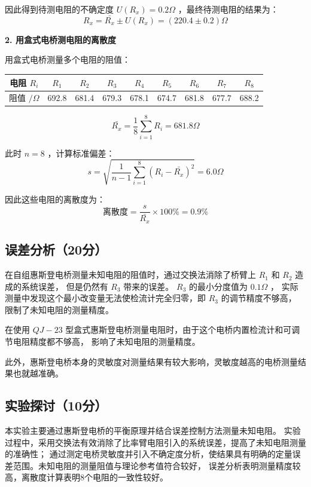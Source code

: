 \documentclass{Phyport}
\begin{document}
因此得到待测电阻的不确定度 $U(R_x) = 0.2 \Omega$ ，最终待测电阻的结果为：
\[
R_x = \bar{R_x} \pm U(R_x) = (220.4 \pm 0.2) \Omega
\]

\textbf{2. 用盒式电桥测电阻的离散度}

用盒式电桥测量多个电阻的阻值：
\begin{table}[htbp!]
    \centering
    \begin{tabular}{c|cccccccc}
        \hline
        电阻 $R_i$ & $R_1$ & $R_2$ & $R_3$ & $R_4$ & $R_5$ & $R_6$ & $R_7$ & $R_8$ \\
        \hline
        阻值 $/ \Omega$ & 692.8 & 681.4 & 679.3 & 678.1 & 674.7 & 681.8 & 677.7 & 688.2 \\
        \hline
    \end{tabular}
\end{table}

\[
\bar{R_x} = \frac{1}{8} \sum_{i=1}^8 R_i = 681.8 \Omega
\]

此时 $n = 8$ ，计算标准偏差：
\[
s = \sqrt{\frac{1}{n - 1} \sum_{i=1}^{8} (R_i - \bar{R_x})^2} = 6.0 \Omega
\]

因此这些电阻的离散度为：
\[
\text{离散度} = \frac{s}{\bar{R_x}} \times 100 \% = 0.9 \%
\]

\subsection{误差分析（20分）}

在自组惠斯登电桥测量未知电阻的阻值时，通过交换法消除了桥臂上 $R_1$ 和 $R_2$ 造成的系统误差，
但是仍然有 $R_3$ 带来的误差。 $R_3$ 的最小分度值为 $0.1 \Omega$ ，
实际测量中发现这个最小改变量无法使检流计完全归零，即 $R_3$ 的调节精度不够高，
限制了未知电阻的测量精度。

在使用 $QJ-23$ 型盒式惠斯登电桥测量电阻时，由于这个电桥内置检流计和可调节电阻精度都不够高，
影响了未知电阻的测量精度。

此外，惠斯登电桥本身的灵敏度对测量结果有较大影响，灵敏度越高的电桥测量结果也就越准确。

\subsection{实验探讨（10分）}

本实验主要通过惠斯登电桥的平衡原理并结合误差控制方法测量未知电阻。
实验过程中，采用交换法有效消除了比率臂电阻引入的系统误差，提高了未知电阻测量的准确性；
通过测定电桥灵敏度并引入不确定度分析，使结果具有明确的定量误差范围。未知电阻的测量阻值与理论参考值符合较好，
误差分析表明测量精度较高，离散度计算表明8个电阻的一致性较好。
\end{document}
